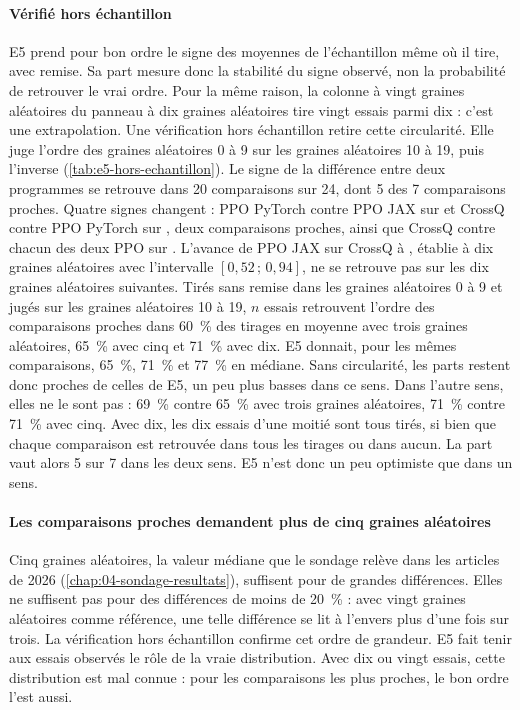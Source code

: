 \paragraph{Vérifié hors échantillon}
E5 prend pour bon ordre le signe des moyennes de l'échantillon même où il tire, avec remise. Sa part mesure
donc la stabilité du signe observé, non la probabilité de retrouver le vrai ordre. Pour la même raison, la
colonne à vingt graines aléatoires du panneau à dix graines aléatoires tire vingt essais parmi dix : c'est une
extrapolation. Une vérification hors échantillon retire cette circularité. Elle juge l'ordre des
graines aléatoires 0 à 9 sur les graines aléatoires 10 à 19, puis l'inverse (\cref{tab:e5-hors-echantillon}).
Le signe de la différence entre deux programmes se retrouve dans 20 comparaisons sur 24, dont 5 des 7
comparaisons proches. Quatre signes changent : PPO PyTorch contre PPO JAX sur  et CrossQ
contre PPO PyTorch sur , deux comparaisons proches, ainsi que CrossQ contre chacun des deux PPO
sur . L'avance de PPO JAX sur CrossQ à , établie à dix graines aléatoires avec
l'intervalle $[0{,}52\,;\,0{,}94]$, ne se retrouve pas sur les dix graines aléatoires suivantes. Tirés sans remise dans
les graines aléatoires 0 à 9 et jugés sur les graines aléatoires 10 à 19, $n$ essais retrouvent l'ordre des
comparaisons proches dans 60~\% des tirages en moyenne avec trois graines aléatoires, 65~\% avec cinq et
71~\% avec dix. E5 donnait, pour les mêmes comparaisons, 65~\%, 71~\% et 77~\% en médiane. Sans circularité,
les parts restent donc proches de celles de E5, un peu plus basses dans ce sens. Dans l'autre sens, elles ne
le sont pas : 69~\% contre 65~\% avec trois graines aléatoires, 71~\% contre 71~\% avec cinq. Avec dix, les dix
essais d'une moitié sont tous tirés, si bien que chaque comparaison est retrouvée dans tous les tirages ou dans
aucun. La part vaut alors 5 sur 7 dans les deux sens. E5 n'est donc un peu optimiste que dans un sens.


\paragraph{Les comparaisons proches demandent plus de cinq graines aléatoires}
Cinq graines aléatoires, la valeur médiane que le sondage relève dans les articles de 2026
(\cref{chap:04-sondage-resultats}), suffisent pour de grandes différences. Elles ne suffisent pas pour des
différences de moins de 20~\% : avec vingt graines aléatoires comme référence, une telle différence se lit à
l'envers plus d'une fois sur trois. La vérification hors échantillon confirme cet ordre de grandeur. E5 fait tenir aux essais
observés le rôle de la vraie distribution. Avec dix ou vingt essais, cette distribution est mal connue : pour
les comparaisons les plus proches, le bon ordre l'est aussi.


